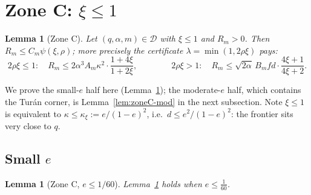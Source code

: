 \documentclass[11pt]{article}
\newtheorem{lemma}[theorem]{Lemma}
\begin{document}
\section{Zone C: $\xi\le1$}\label{sec:zoneC}

\begin{lemma}[Zone C]\label{lem:zoneC}
Let $(q,\alpha,m)\in\mathcal D$ with $\xi\le1$ and $R_m>0$.  Then
$R_m\le C_m\psi(\xi,\rho)$; more precisely the certificate
$\lambda=\min(1,2\rho\xi)$ pays:
\[
        2\rho\xi\le1:\quad R_m\le2\alpha^3A_m\kappa^2\cdot\frac{1+4\xi}{1+2\xi},
        \qquad\qquad
        2\rho\xi>1:\quad R_m\le\sqrt{2\alpha}\,B_mfd\cdot\frac{4\xi+1}{4\xi+2}.
\]
\end{lemma}

We prove the small-$e$ half here (Lemma~\ref{lem:zoneC-small}); the
moderate-$e$ half, which contains the Tur\'an corner, is
Lemma~\ref{lem:zoneC-mod} in the next subsection.  Note $\xi\le1$ is
equivalent to $\kappa\le\kappa_\xi:=e/(1-e)^2$, i.e.\ $d\le e^2/(1-e)^2$: the
frontier sits very close to $q$.

\subsection{Small $e$}

\begin{lemma}[Zone C, $e\le1/60$]\label{lem:zoneC-small}
Lemma~\ref{lem:zoneC} holds when $e\le\tfrac1{60}$.
\end{lemma}
\end{document}
